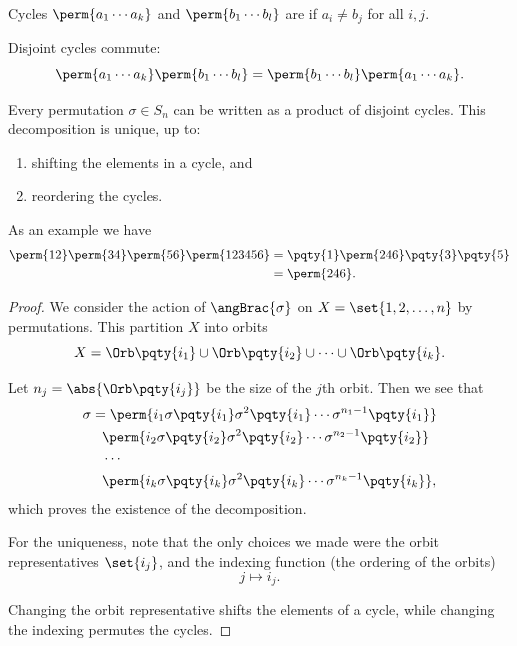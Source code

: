 \begin{definition}
    \label{def:disjoint-cycles}%
    Cycles \(\perm{{a_1} \cdots {a_k}}\) and \(\perm{{b_1} \cdots {b_l}}\) are  if \(a_i \neq b_j\) for all \(i, j\).
\end{definition}

Disjoint cycles commute:
\[
    \perm{{a_1} \cdots {a_k}} \perm{{b_1} \cdots {b_l}} = \perm{{b_1} \cdots {b_l}} \perm{{a_1} \cdots {a_k}}.
\]

\begin{theorem}
    \label{thm:disjoint-cycles-decomposition}%
    Every permutation \(\sigma \in S_n\) can be written as a product of disjoint cycles. This decomposition is unique, up to:
    \begin{enumerate}
        \item shifting the elements in a cycle, and
        \item reordering the cycles.
    \end{enumerate}
\end{theorem}

\begin{example*}
    As an example we have
    \begin{align*}
        \perm{12}\perm{34}\perm{56}\perm{123456} &= \pqty{1} \perm{246} \pqty{3} \pqty{5} \\
        &= \perm{246}.
    \end{align*}
\end{example*}

\begin{proof}
    We consider the action of \(\angBrac{\sigma}\) on \(X = \set{1, 2, \ldots, n}\) by permutations. This partition \(X\) into orbits
    \[
        X = \Orb\pqty{i_1} \cup \Orb\pqty{i_2} \cup \cdots \cup \Orb\pqty{i_k}.
    \]

    Let \(n_j = \abs{\Orb\pqty{i_j}}\) be the size of the \(j\)th orbit. Then we see that
    \begin{align*}
        \sigma &= \perm{{i_1} {\sigma\pqty{i_1}} {\sigma^{2}\pqty{i_1}} \cdots {\sigma^{n_1 - 1} \pqty{i_1}}} \\
        &\phantom{=} \perm{{i_2} {\sigma\pqty{i_2}} {\sigma^{2}\pqty{i_2}} \cdots {\sigma^{n_2 - 1} \pqty{i_2}}} \\
        &\phantom{=} \cdots \\
        &\phantom{=} \perm{{i_k} {\sigma\pqty{i_k}} {\sigma^{2}\pqty{i_k}} \cdots {\sigma^{n_k - 1} \pqty{i_k}}},
    \end{align*}
    which proves the existence of the decomposition.

    For the uniqueness, note that the only choices we made were the orbit representatives \(\set{i_j}\), and the indexing function (the ordering of the orbits)
    \[
        j \mapsto i_j.
    \]

    Changing the orbit representative shifts the elements of a cycle, while changing the indexing permutes the cycles.
\end{proof}

